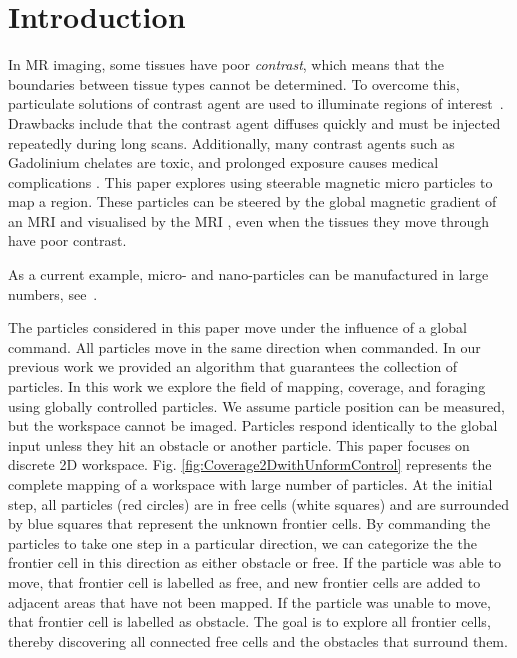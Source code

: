 \section{Introduction}\label{sec:Intro}
In MR imaging, some tissues have poor \emph{contrast}, which means that the boundaries between tissue types cannot be determined.
 To overcome this, particulate solutions of contrast agent are used to illuminate regions of interest~\cite{na2009inorganic}. 
 Drawbacks include that the contrast agent diffuses quickly and must be injected repeatedly during long scans. 
 Additionally, many contrast agents such as Gadolinium chelates are toxic, and prolonged exposure causes medical complications \cite{caravan1999gadolinium}. 
This paper explores using steerable magnetic micro particles to map a region. 
These particles can be steered by the global magnetic gradient of an MRI and visualised by the MRI \cite{Vartholomeos2012}, even when the tissues they move through  have poor contrast.

As a current example, micro- and nano-particles can be manufactured in large numbers, see~\cite{Chowdhury2015,martel2014computer,kim2015imparting,Donald2013,Ghosh2009,Ou2013,qiu2015magnetic}.

The particles considered in this paper move under the influence of a global command. All particles move in the same direction when commanded. 
In our previous work \cite{mahadev2016collecting} we provided an algorithm that guarantees the collection of particles.
 In this work we explore the field of mapping, coverage, and foraging using globally controlled particles. 
 We assume particle position can be measured, but the workspace cannot be imaged. 
 Particles respond identically to the global input unless they hit an obstacle or another particle. 
 This paper focuses on discrete 2D workspace.
Fig. \ref{fig:Coverage2DwithUnformControl} represents the complete mapping of a workspace with large number of particles.  
At the initial step, all  particles (red circles) are in free cells (white squares) and are surrounded by blue squares that represent the unknown frontier cells.
By commanding the particles to take one step in a particular direction, we can categorize the the frontier cell in this direction as either obstacle or free.
 If the particle was able to move, that frontier cell is labelled as free, and new frontier cells are added to adjacent areas that have not been mapped.
 If the particle was unable to move, that frontier cell is labelled as obstacle.
The goal is to explore all  frontier cells, thereby discovering all connected free cells and the obstacles that surround them. 


